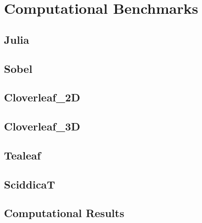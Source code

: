 \chapter{Computational Benchmarks}

\section{Julia}

\section{Sobel}

\section{Cloverleaf\_2D}

\section{Cloverleaf\_3D}

\section{Tealeaf}

\section{SciddicaT}

\section{Computational Results}